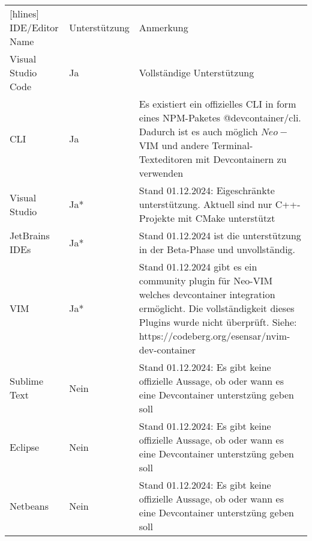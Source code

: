 \begin{table}[H]
    \begin{NiceTabular}{X|X|X[4]}[hlines]
        IDE/Editor Name    & Unterstützung & Anmerkung \\
        Visual Studio Code & Ja            & Vollständige Unterstützung                                                                                                                                                                                              \\
        CLI                & Ja            & Es existiert ein offizielles CLI in form eines NPM-Paketes @devcontainer/cli. Dadurch ist es auch möglich \(Neo-\)VIM und andere Terminal-Texteditoren mit Devcontainern zu verwenden                                   \\
        Visual Studio      & Ja*           & Stand 01.12.2024: Eigeschränkte unterstützung. Aktuell sind nur C++-Projekte mit CMake unterstützt                                                                                                                      \\
        JetBrains IDEs     & Ja*           & Stand 01.12.2024 ist die unterstützung in der Beta-Phase und unvollständig.                                                                                                                                             \\
        VIM                & Ja*           & Stand 01.12.2024 gibt es ein community plugin für Neo-VIM welches devcontainer integration ermöglicht. Die vollständigkeit dieses Plugins wurde nicht überprüft. Siehe: https://codeberg.org/esensar/nvim-dev-container \\
        Sublime Text       & Nein          & Stand 01.12.2024: Es gibt keine offizielle Aussage, ob oder wann es eine Devcontainer unterstzüng geben soll                                                                                                            \\
        Eclipse            & Nein          & Stand 01.12.2024: Es gibt keine offizielle Aussage, ob oder wann es eine Devcontainer unterstzüng geben soll                                                                                                            \\
        Netbeans           & Nein          & Stand 01.12.2024: Es gibt keine offizielle Aussage, ob oder wann es eine Devcontainer unterstzüng geben soll                                                                                                            \\

\end{NiceTabular}
\end{table}
